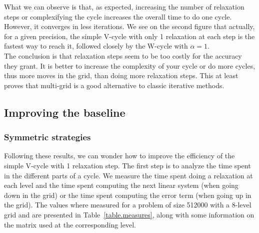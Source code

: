 \documentclass[a4paper,10pt]{article}
\begin{document}
What we can observe is that, as expected, increasing the number of relaxation steps or complexifying the cycle increases the overall time to do one cycle. However, it converges in less iterations.
We see on the second figure that actually, for a given precision, the simple V-cycle with only 1 relaxation at each step is the fastest way to reach it, followed closely by the W-cycle with $\alpha=1$.\\
The conclusion is that relaxation steps seem to be too costly for the accuracy they grant. It is better to increase the complexity of your cycle or do more cycles, thus more moves in the grid, than doing more relaxation steps. This at least proves
that multi-grid is a good alternative to classic iterative methods.

\subsection{Improving the baseline}

\subsubsection{Symmetric strategies}
Following these results, we can wonder how to improve the efficiency of the simple V-cycle with 1 relaxation step.
The first step is to analyze the time spent in the different parts of a cycle. We measure the time spent doing a relaxation at each level and the time spent computing the next linear system
(when going down in the grid) or the time spent computing the error term (when going up in the grid). The values where measured for a problem of size 512000 with a 8-level grid and are presented
in Table~\ref{table.measures}, along with some information on the matrix used at the corresponding level.
\end{document}
